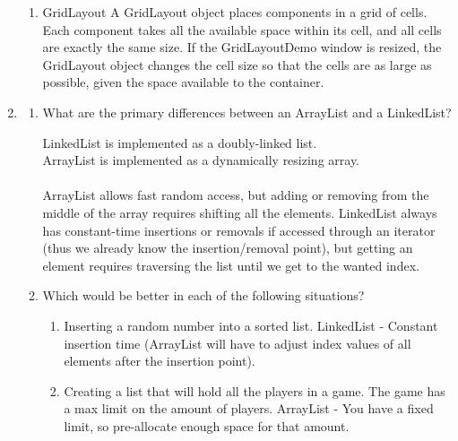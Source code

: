 \documentclass[11pt]{article}
\newenvironment{answer}{\large\lstset{basicstyle=\tiny\ttfamily}\color{white} }{}
\newenvironment{answer}{\large\lstset{basicstyle=\large\ttfamily}\color{red} }{}
\begin{document}
\begin{enumerate}
\begin{enumerate}
\item GridLayout
\begin{answer}
A GridLayout object places components in a grid of cells. Each component takes all the available space within its cell, and all cells are exactly the same size. If the GridLayoutDemo window is resized, the GridLayout object changes the cell size so that the cells are as large as possible, given the space available to the container.\end{answer}
\end{enumerate}




\item
\begin{enumerate}
	\item What are the primary differences between an ArrayList and a LinkedList?
	
	\begin{answer}
	LinkedList is implemented as a doubly-linked list.
	\\ArrayList is implemented as a dynamically resizing array.
	\\ \\ArrayList allows fast random access, but adding or removing from the middle of the array
	requires shifting all the elements. LinkedList always has constant-time insertions or removals
	if accessed through an iterator (thus we already know the insertion/removal point), but getting
	an element requires traversing the list until we get to the wanted index.
	
	\end{answer}
	
	\item Which would be better in each of the following situations?
	\begin{enumerate}
		\item Inserting a random number into a sorted list.
		\begin{answer}
		LinkedList - Constant insertion time (ArrayList will have to adjust index values of all elements after the insertion point).
		\end{answer}
		
		\item Creating a list that will hold all the players in a game.  The game has a max limit on the amount of players. 
		\begin{answer}
		ArrayList - You have a fixed limit, so pre-allocate enough space for that amount.
		\end{answer}
 

\end{enumerate}
\end{enumerate}
\end{enumerate}
\end{document}
